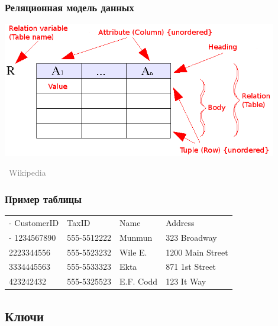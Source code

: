 \documentclass[xetex,mathserif,serif]{beamer}
\newcommand{\attribution}[1] {
\vspace{-5mm}\begin{flushright}\begin{scriptsize}\textcolor{gray}{\textcopyright\, #1}\end{scriptsize}\end{flushright}
}
\begin{document}
	\begin{frame}
		\frametitle{Реляционная модель данных}
		\begin{center}
			\includegraphics[width=0.9\textwidth]{relationalModel.png}
			\attribution{Wikipedia}
		\end{center}
	\end{frame}

	\begin{frame}
		\frametitle{Пример таблицы}
		\begin{center}
			\begin{tabu} {| X[0.9 l p] | X[1 l p] | X[1 l p] | X[1 l p] |}
				\tabucline-
				CustomerID       & TaxID        & Name       & Address           \\
				\tabucline-
				\everyrow{\tabucline-}
				1234567890       & 555-5512222  & Munmun     & 323 Broadway      \\
				2223344556       & 555-5523232  & Wile E.    & 1200 Main Street  \\
				3334445563       & 555-5533323  & Ekta       & 871 1st Street    \\
				423242432        & 555-5325523  & E.F. Codd  & 123 It Way        \\
			\end{tabu}
		\end{center}
	\end{frame}

	\subsection{Ключи}
\end{document}
